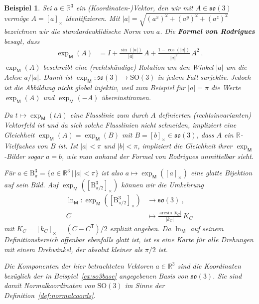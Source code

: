 \documentclass[10pt,a4paper]{article}
\theoremstyle{mytheorem}
\theoremstyle{mydefinition}
\newtheorem{example}[theorem]{Beispiel}
\newcommand{\mydef}[1]{\textbf{\textit{#1}}}
\newcommand{\trans}{^\mathsf{T}}
\newcommand{\SO}{\mathrm{SO}}
\newcommand{\fso}{\mathfrak{so}}
\begin{document}
\begin{example}
Sei $a\in\mathbb{R}^3$ ein (Koordinaten-)Vektor, den wir mit $A\in\fso(3)$ vermöge $A=[a]_\times$ identifizieren.
Mit $|a|=\sqrt{(a^x)^2+(a^y)^2+(a^z)^2}$ bezeichnen wir die standard\-euklidische Norm von $a$.
Die \mydef{Formel von Rodrigues} besagt, dass
\begin{align*}
	\exp_\mathsf{M}(A)
	&=
	I + \frac{\sin(|a|)}{|a|}\,A + \frac{1 - \cos(|a|)}{|a|^2}\,A^2
	\ .
\end{align*}
$\exp_\mathsf{M}(A)$ beschreibt eine (rechtshändige) Rotation um den Winkel $|a|$ um die Achse $a/|a|$.\footnotemark
Damit ist $\exp_\mathsf{M}:\fso(3)\rightarrow \SO(3)$ in jedem Fall surjektiv.
Jedoch ist die Abbildung nicht global injektiv, weil zum Beispiel für $|a|=\pi$ die Werte $\exp_\mathsf{M}(A)$ und $\exp_\mathsf{M}(-A)$ übereinstimmen.

Da $t\mapsto\exp_\mathsf{M}(tA)$ eine Flusslinie zum durch $A$ definierten (rechtsinvarianten) Vektorfeld ist und da sich solche Flusslinien nicht schneiden, impliziert eine Gleichheit $\exp_\mathsf{M}(A)=\exp_\mathsf{M}(B)$ mit $B=[b]_\times\in\fso(3)$, dass $A$ ein $\mathbb{R}$-Vielfaches von $B$ ist.
Ist $|a|<\pi$ und $|b|<\pi$, impliziert die Gleichheit ihrer $\exp_\mathsf{M}$-Bilder sogar $a=b$, wie man anhand der Formel von Rodrigues unmittelbar sieht.

Für $a\in\mathrm{B}^3_\pi=\{a\in\mathbb{R}^3\,|\,|a|<\pi\}$ ist also $a\mapsto\exp_\mathsf{M}([a]_\times)$ eine glatte Bijektion auf sein Bild.
Auf $\exp_\mathsf{M}([\mathrm{B}^3_{\pi/2}]_\times)$ können wir die Umkehrung
\begin{align*}
	\ln_\mathsf{M}:
	\exp_\mathsf{M}([\mathrm{B}^3_{\pi/2}]_\times)
	&\rightarrow \fso(3)
	\ ,\nonumber\\
	C 
	&\mapsto
	\frac{\arcsin|k_C|}{|k_C|}
	\, K_C
\end{align*}
mit $K_C=[k_C]_\times=(C-C\trans)/2$ explizit angeben.
Da $\ln_\mathsf{M}$ auf seinem Definitionsbereich offenbar ebenfalls glatt ist, ist es eine Karte für alle Drehungen mit einem Drehwinkel, der absolut kleiner als $\pi/2$ ist.

Die Komponenten der hier betrachteten Vektoren $a\in\mathbb{R}^3$ sind die Koordinaten bezüglich der in Beispiel~\ref{ex:so3base} angegebenen Basis von $\fso(3)$.
Sie sind damit Normalkoordinaten von $\SO(3)$ im Sinne der Definition~\ref{def:normalcoords}.
\end{example}
\end{document}
